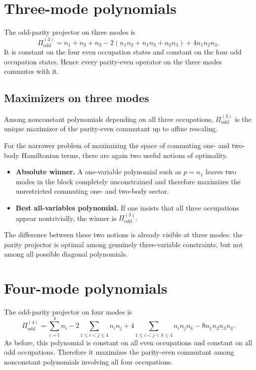 \documentclass[11pt]{article}
\newcommand{\odd}{\mathrm{odd}}
\theoremstyle{definition}
\theoremstyle{remark}
\begin{document}
\section{Three-mode polynomials}
The odd-parity projector on three modes is
\begin{equation}
  \Pi^{(3)}_{\odd}
  = n_1+n_2+n_3
  -2(n_1n_2+n_1n_3+n_2n_3)
  +4n_1n_2n_3.
\end{equation}
It is constant on the four even occupation states and constant on the four odd occupation states. Hence every parity-even operator on the three modes commutes with it.

\subsection{Maximizers on three modes}
Among nonconstant polynomials depending on all three occupations, $\Pi^{(3)}_{\odd}$ is the unique maximizer of the parity-even commutant up to affine rescaling.

For the narrower problem of maximizing the space of commuting one- and two-body Hamiltonian terms, there are again two useful notions of optimality.
\begin{itemize}[leftmargin=2em]
  \item \textbf{Absolute winner.} A one-variable polynomial such as $p=n_1$ leaves two modes in the block completely unconstrained and therefore maximizes the unrestricted commuting one- and two-body sector.
  \item \textbf{Best all-variables polynomial.} If one insists that all three occupations appear nontrivially, the winner is $\Pi^{(3)}_{\odd}$.
\end{itemize}
The difference between these two notions is already visible at three modes: the parity projector is optimal among genuinely three-variable constraints, but not among all possible diagonal polynomials.

\section{Four-mode polynomials}
The odd-parity projector on four modes is
\begin{equation}
  \Pi^{(4)}_{\odd}
  = \sum_{i=1}^4 n_i
  -2\sum_{1\le i<j\le 4} n_in_j
  +4\sum_{1\le i<j<k\le 4} n_in_jn_k
  -8 n_1n_2n_3n_4.
\end{equation}
As before, this polynomial is constant on all even occupations and constant on all odd occupations. Therefore it maximizes the parity-even commutant among nonconstant polynomials involving all four occupations.
\end{document}
